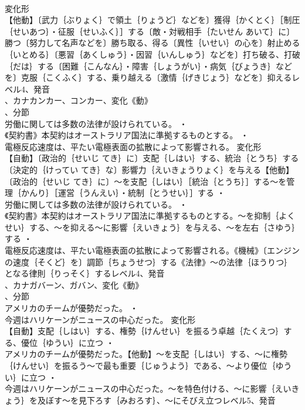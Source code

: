 \documentclass[8pt]{extreport}
\begin{document}
\begin{CJK}{UTF8}{min}
\\	変化形 
\\	【他動】〔武力｛ぶりょく｝で領土｛りょうど｝などを〕獲得｛かくとく｝［制圧｛せいあつ｝・征服｛せいふく｝］する〔敵・対戦相手｛たいせん あいて｝に〕勝つ〔努力して名声などを〕勝ち取る、得る〔異性｛いせい｝の心を〕射止める｛いとめる｝〔悪習｛あくしゅう｝・因習｛いんしゅう｝などを〕打ち破る、打破｛だは｝する〔困難｛こんなん｝・障害｛しょうがい｝・病気｛びょうき｝などを〕克服｛こくふく｝する、乗り越える〔激情｛げきじょう｝などを〕抑えるレベル4、発音
\\	、カナカンカー、コンカー、変化《動》
\\	、分節
\\	労働に関しては多数の法律が設けられている。 ・
\\	《契約書》本契約はオーストラリア国法に準拠するものとする。 ・
\\	電極反応速度は、平たい電極表面の拡散によって影響される。	変化形 
\\	【自動】〔政治的｛せいじ てき｝に〕支配｛しはい｝する、統治｛とうち｝する〔決定的｛けってい てき｝な〕影響力｛えいきょうりょく｝を与える【他動】〔政治的｛せいじ てき｝に〕～を支配｛しはい｝［統治｛とうち｝］する～を管理｛かんり｝［運営｛うんえい｝・統制｛とうせい｝］する ・
\\	労働に関しては多数の法律が設けられている。 ・
\\	《契約書》本契約はオーストラリア国法に準拠するものとする。～を抑制｛よくせい｝する、～を抑える～に影響｛えいきょう｝を与える、～を左右｛さゆう｝する ・
\\	電極反応速度は、平たい電極表面の拡散によって影響される。《機械》〔エンジンの速度｛そくど｝を〕調節｛ちょうせつ｝する《法律》～の法律｛ほうりつ｝となる律則｛りっそく｝するレベル4、発音
\\	、カナガバーン、ガバン、変化《動》
\\	、分節
\\	アメリカのチームが優勢だった。 ・
\\	今週はハリケーンがニュースの中心だった。	変化形 
\\	【自動】支配｛しはい｝する、権勢｛けんせい｝を振るう卓越｛たくえつ｝する、優位｛ゆうい｝に立つ ・
\\	アメリカのチームが優勢だった。【他動】～を支配｛しはい｝する、～に権勢｛けんせい｝を振るう～で最も重要｛じゅうよう｝である、～より優位｛ゆうい｝に立つ ・
\\	今週はハリケーンがニュースの中心だった。～を特色付ける、～に影響｛えいきょう｝を及ぼす～を見下ろす｛みおろす｝、～にそびえ立つレベル5、発音

\end{CJK}
\end{document}
